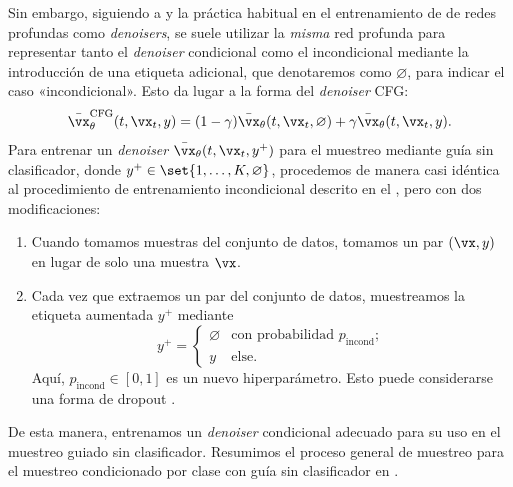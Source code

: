 \documentclass[../../book-main_es.tex]{subfiles}
\begin{document}
Sin embargo, siguiendo a \textcite{Ho2022-ry} y la práctica habitual en el
entrenamiento de de redes profundas como \textit{denoisers},
se suele utilizar la \textit{misma} red profunda para representar
tanto el \textit{denoiser} condicional como el incondicional mediante la introducción de una
etiqueta adicional, que denotaremos como $\varnothing$, para indicar el caso «incondicional».
Esto da lugar a la forma del \textit{denoiser} CFG:
\begin{equation}\label{eq:conditional-denoising-mmse-denoiser-paired-data-approx-cfg}
    \bar{\vx}_{\theta}^{\mathrm{CFG}}(t, \vx_t, y)
    =
    (1 - \gamma) \bar{\vx}_{\theta}(t, \vx_t, \varnothing)
    +
    \gamma \bar{\vx}_{\theta}(t, \vx_t, y).
\end{equation}
Para entrenar un \textit{denoiser} $\bar{\vx}_{\theta}(t, \vx_t, y^+)$ para
el muestreo mediante guía sin clasificador, donde $y^+ \in
\set{1, \dots, K, \varnothing}$, procedemos de manera casi idéntica al
procedimiento de entrenamiento incondicional descrito en el , pero con dos
modificaciones:
\begin{enumerate}
    \item Cuando tomamos muestras del conjunto de datos, tomamos un par $(\vx, y)$ en lugar de
        solo una muestra $\vx$.
    \item Cada vez que extraemos un par del conjunto de datos, muestreamos la etiqueta aumentada
        $y^+$ mediante
        \begin{equation}
            y^+ =
            \begin{cases}
                \varnothing & \text{con probabilidad } p_{\mathrm{incond}}; \\
                y & \text{else}.
            \end{cases}
        \end{equation}
        Aquí, $p_{\mathrm{incond}} \in [0, 1]$ es un nuevo hiperparámetro.
        Esto puede considerarse una forma de dropout \cite{srivastava2014dropout}.
\end{enumerate}
De esta manera, entrenamos un \textit{denoiser} condicional adecuado para su uso en el muestreo guiado sin clasificador.
Resumimos el proceso general de muestreo para
el muestreo condicionado por clase con guía sin clasificador en
.
\end{document}
